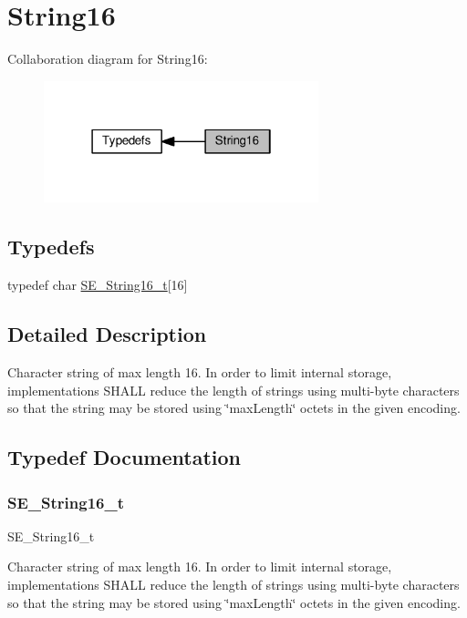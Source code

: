 \hypertarget{group__String16}{}\section{String16}
\label{group__String16}
Collaboration diagram for String16\+:\nopagebreak
\begin{figure}[H]
\begin{center}
\leavevmode
\includegraphics[width=226pt]{group__String16}
\end{center}
\end{figure}
\subsection*{Typedefs}
\begin{DoxyCompactItemize}
\item 
typedef char \hyperlink{group__String16_ga96799b35e03c3e6545eb138a7f879015}{S\+E\+\_\+\+String16\+\_\+t}\mbox{[}16\mbox{]}
\end{DoxyCompactItemize}


\subsection{Detailed Description}
Character string of max length 16. In order to limit internal storage, implementations S\+H\+A\+LL reduce the length of strings using multi-\/byte characters so that the string may be stored using \char`\"{}max\+Length\char`\"{} octets in the given encoding. 

\subsection{Typedef Documentation}
\mbox{\label{group__String16_ga96799b35e03c3e6545eb138a7f879015}} 
\subsubsection{\texorpdfstring{S\+E\+\_\+\+String16\+\_\+t}{SE\_String16\_t}}
{\footnotesize\ttfamily S\+E\+\_\+\+String16\+\_\+t}

Character string of max length 16. In order to limit internal storage, implementations S\+H\+A\+LL reduce the length of strings using multi-\/byte characters so that the string may be stored using \char`\"{}max\+Length\char`\"{} octets in the given encoding. 